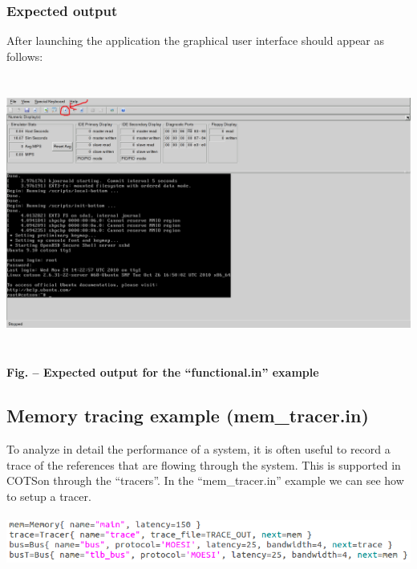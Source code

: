 \documentclass[a4paper]{article}
\newcounter{Figure}
\renewcommand\theFigure{\arabic{Figure}}
\begin{document}
\subsubsection[Expected output]{\rmfamily Expected output}
{
After launching the application the graphical user interface should
appear as follows:}


\includegraphics[width=6.2602in,height=3.5673in]{img24.png}


{\centering{}\sffamily\bfseries
\label{bkm:Ref388170568}Fig.
\stepcounter{Figure}{\theFigure} -- Expected output for the
{\textquotedblleft}functional.in{\textquotedblright} example
\par}

\subsection[Memory tracing example
(mem\_tracer.in)]{ Memory tracing example
(mem\_tracer.in)}
{
To analyze in detail the performance of a system, it is often useful to
record a trace of the references that are flowing through the system.
This is supported in COTSon through the
{\textquotedblleft}tracers{\textquotedblright}. In the
{\textquotedblleft}mem\_tracer.in{\textquotedblright} example we can
see how to setup a tracer.}

{\centering 
\includegraphics[width=6.2709in,height=0.6575in]{img25.png}
\par}
\end{document}
